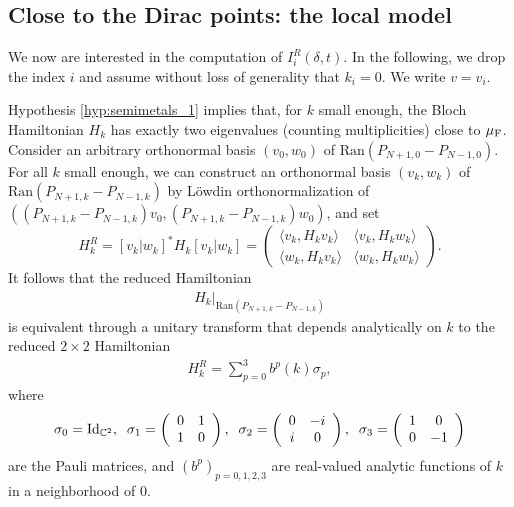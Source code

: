 \documentclass[a4paper,11pt]{article}
\newcommand{\Ran}{\mathrm{Ran}}
\theoremstyle{plain}
\theoremstyle{remark}
\def\C{{\mathbb C}}
\begin{document}
\subsection{Close to the Dirac points: the local model}
We now are interested in the computation of $I_i^R(\delta,t)$.
In the following, we drop the index $i$ and assume without loss of
generality that $k_i=0$. We write $v=v_i$.

Hypothesis \eqref{hyp:semimetals_1} implies that, for $k$ small
enough, the Bloch Hamiltonian $H_k$ has exactly two eigenvalues
(counting multiplicities) close to $\mu_{\rm F}$. Consider an
arbitrary orthonormal basis $(v_0,w_0)$ of
$\Ran(P_{N+1,0} - P_{N-1,0})$. For all $k$ small
enough, we can construct an orthonormal basis $(v_k,w_k)$ of
$\Ran(P_{N+1,k} - P_{N-1,k})$ by L\"owdin
orthonormalization of
$((P_{N+1,k} - P_{N-1,k})v_0,(P_{N+1,k} -
P_{N-1,k})w_0)$, and set
$$
H_k^{R} = [v_{k} | w_{k}]^{*}
H_k[v_{k} | w_{k}] = \left( \begin{array}{cc} \langle v_k, H_k v_k \rangle &  \langle v_k, H_k w_k \rangle \\
\langle w_k, H_k v_k \rangle &  \langle w_k, H_k w_k \rangle \end{array} \right).
$$
It follows that the reduced Hamiltonian
\begin{align*}
  H_k\Big|_{\Ran(P_{N+1,k} - P_{N-1,k}) }
\end{align*}
is equivalent through a unitary transform that depends analytically on $k$
to the reduced $2 \times 2$ Hamiltonian
\begin{align}
  \label{eq:Hmatk}
  H_k^{R} = \sum_{p=0}^3 b^{p}(k) \sigma_{p},
\end{align}
where $$\sigma_{0} = {\rm Id}_{\C^{2}}, \;\; \sigma_{1}=\left( \begin{array}{cc} 0 & 1 \\ 1 & 0 \end{array} \right), \;\;\sigma_{2}=\left( \begin{array}{cc} 0 & -i \\ i & 0 \end{array} \right), \;\;\sigma_{3}=\left( \begin{array}{cc} 1 & 0 \\ 0 & -1 \end{array} \right)$$
are the Pauli matrices, and $(b^{p})_{p=0,1,2,3}$ are real-valued
analytic functions of $k$ in a neighborhood of $0$.
\end{document}
